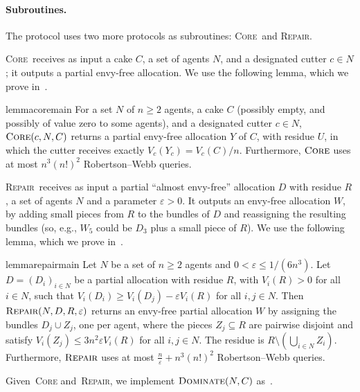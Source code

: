 \documentclass[11pt]{article}
\newcommand{\eps}{\varepsilon}
\newcommand{\Core}{\textsc{Core}}
\newcommand{\Repair}{\textsc{Repair}}
\newcommand{\Dominate}{\textsc{Dominate}}
\theoremstyle{plain}
\theoremstyle{definition}
\theoremstyle{plain}
\begin{document}
\paragraph{Subroutines.} The protocol uses two more protocols as subroutines: \Core~and \Repair. 

\Core~receives as input a cake $C$, a set of agents $N$, and a designated cutter $c \in N$; it outputs a partial envy-free allocation. We use the following lemma, which we prove in~.

\begin{restatable}{lemma}{coremain}\label{lem:core main}
For a set $N$ of $n\geq 2$ agents, a cake $C$ (possibly empty, and possibly of value zero to some agents), and a designated cutter $c\in N$, $\Core(c,N,C)$ returns a partial envy-free allocation $Y$ of $C$, with residue $U$, in which the cutter receives exactly $V_c(Y_c)=V_c(C)/n$. Furthermore, $\Core{}$ uses at most $n^3(n!)^2$ Robertson--Webb queries.
\end{restatable}

\Repair~receives as input a partial ``almost envy-free'' allocation $D$ with residue $R$, a set of agents $N$ and a parameter $\eps > 0$. It outputs an envy-free allocation $W$, by adding small pieces from $R$ to the bundles of $D$ and reassigning the resulting bundles (so, e.g., $W_5$ could be $D_3$ plus a small piece of $R$). We use the following lemma, which we prove in~.


\begin{restatable}{lemma}{repairmain}\label{lem:repair main}
Let $N$ be a set of $n\geq 2$ agents and $0<\eps\leq 1/(6n^3)$. Let $D=(D_i)_{i\in N}$ be a partial allocation with residue $R$,
with $V_i(R)>0$ for all $i\in N$, such that
$V_i(D_i)\geq V_i(D_j)-\eps V_i(R)$ for all $i,j\in N$. 
Then $\Repair(N,D,R,\eps)$ returns an envy-free partial allocation $W$ by assigning the bundles $D_j \cup Z_j$, one per agent, where the pieces $Z_j\subseteq R$ are pairwise disjoint and satisfy $V_i(Z_j)\leq 3n^2\eps V_i(R)$ for all $i,j\in N$. The residue is $R\setminus \left( \bigcup_{i \in N}Z_i \right)$. Furthermore, $\Repair{}$ uses at most $\frac{n}{\eps}+n^3(n!)^2$ Robertson--Webb queries.
\end{restatable}


Given~\Core{} and~\Repair{}, we implement $\Dominate(N,C)$ as~.
\end{document}
